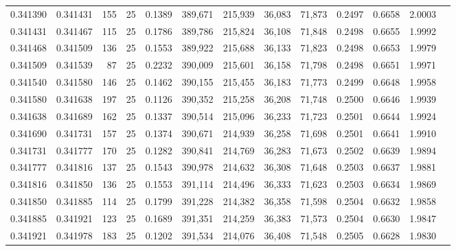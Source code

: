 \begin{tabular}{rrrrrrrrrrrrr}
0.341390 & 0.341431 &   155 &  25 &                                     0.1389 & 389,671 & 215,939 &  36,083 &  71,873 & 0.2497 & 0.6658 & 2.0003 \\
0.341431 & 0.341467 &   115 &  25 &                                     0.1786 & 389,786 & 215,824 &  36,108 &  71,848 & 0.2498 & 0.6655 & 1.9992 \\
0.341468 & 0.341509 &   136 &  25 &                                     0.1553 & 389,922 & 215,688 &  36,133 &  71,823 & 0.2498 & 0.6653 & 1.9979 \\
0.341509 & 0.341539 &    87 &  25 &                                     0.2232 & 390,009 & 215,601 &  36,158 &  71,798 & 0.2498 & 0.6651 & 1.9971 \\
0.341540 & 0.341580 &   146 &  25 &                                     0.1462 & 390,155 & 215,455 &  36,183 &  71,773 & 0.2499 & 0.6648 & 1.9958 \\
0.341580 & 0.341638 &   197 &  25 &                                     0.1126 & 390,352 & 215,258 &  36,208 &  71,748 & 0.2500 & 0.6646 & 1.9939 \\
0.341638 & 0.341689 &   162 &  25 &                                     0.1337 & 390,514 & 215,096 &  36,233 &  71,723 & 0.2501 & 0.6644 & 1.9924 \\
0.341690 & 0.341731 &   157 &  25 &                                     0.1374 & 390,671 & 214,939 &  36,258 &  71,698 & 0.2501 & 0.6641 & 1.9910 \\
0.341731 & 0.341777 &   170 &  25 &                                     0.1282 & 390,841 & 214,769 &  36,283 &  71,673 & 0.2502 & 0.6639 & 1.9894 \\
0.341777 & 0.341816 &   137 &  25 &                                     0.1543 & 390,978 & 214,632 &  36,308 &  71,648 & 0.2503 & 0.6637 & 1.9881 \\
0.341816 & 0.341850 &   136 &  25 &                                     0.1553 & 391,114 & 214,496 &  36,333 &  71,623 & 0.2503 & 0.6634 & 1.9869 \\
0.341850 & 0.341885 &   114 &  25 &                                     0.1799 & 391,228 & 214,382 &  36,358 &  71,598 & 0.2504 & 0.6632 & 1.9858 \\
0.341885 & 0.341921 &   123 &  25 &                                     0.1689 & 391,351 & 214,259 &  36,383 &  71,573 & 0.2504 & 0.6630 & 1.9847 \\
0.341921 & 0.341978 &   183 &  25 &                                     0.1202 & 391,534 & 214,076 &  36,408 &  71,548 & 0.2505 & 0.6628 & 1.9830 \\

\end{tabular}
